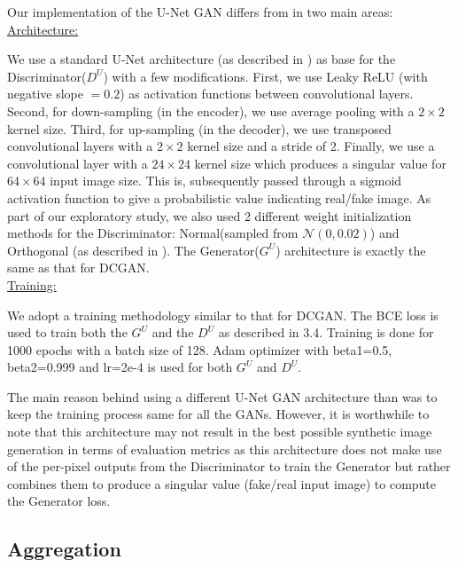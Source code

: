 \documentclass[10pt,journal,compsoc]{IEEEtran}
\begin{document}
Our implementation of the U-Net GAN differs from \cite{Schonfeld2020} in two main areas: \\
\underline{Architecture:}

We use a standard U-Net architecture (as described in \cite{unet}) as base for the Discriminator($D^U$) with a few modifications. First, we use Leaky ReLU (with negative slope $= 0.2$) as activation functions between convolutional layers. Second, for down-sampling (in the encoder), we use average pooling with a $2 \times 2$ kernel size. Third, for up-sampling (in the decoder), we use transposed convolutional layers with a $2 \times 2$ kernel size and a stride of 2. Finally, we use a convolutional layer with a $24 \times 24$ kernel size which produces a singular value for $64 \times 64$ input image size. This is, subsequently passed through a sigmoid activation function to give a probabilistic value indicating real/fake image. As part of our exploratory study, we also used 2 different weight initialization methods for the Discriminator: Normal(sampled from $\mathcal{N}(0,0.02)$) and Orthogonal (as described in \cite{ortho}). The Generator($G^U$) architecture is exactly the same as that for DCGAN. \\
\underline{Training:}

We adopt a training methodology similar to that for DCGAN. The BCE loss is used to train both the $G^U$ and the $D^U$ as described in 3.4. Training is done for 1000 epochs with a batch size of 128. Adam optimizer with beta1=0.5, beta2=0.999 and lr=2e-4 is used for both $G^U$ and $D^U$.

The main reason behind using a different U-Net GAN architecture than \cite{Schonfeld2020} was to keep the training process same for all the GANs. However, it is worthwhile to note that this architecture may not result in the best possible synthetic image generation in terms of evaluation metrics as this architecture does not make use of the per-pixel outputs from the Discriminator to train the Generator but rather combines them to produce a singular value (fake/real input image) to compute the Generator loss.

\subsection{Aggregation}
\end{document}
